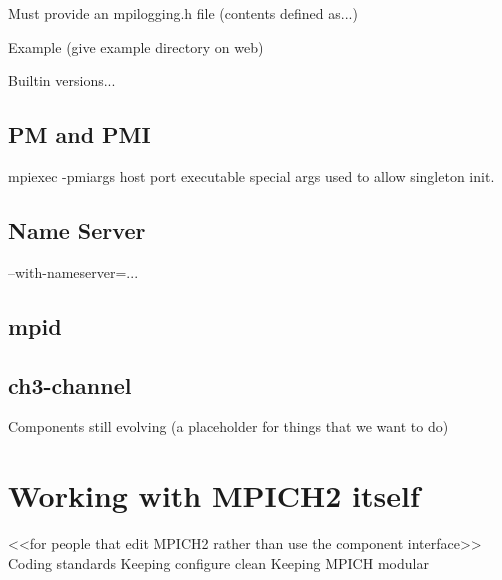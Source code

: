 \documentclass{report}
\begin{document}
    Must provide an mpilogging.h file (contents defined as...)

    Example (give example directory on web)

    Builtin versions...

\section{PM and PMI}

mpiexec 
    -pmiargs host port executable
special args used to allow singleton init.

\section{Name Server}

    --with-nameserver=...

\section{mpid}
\section{ch3-channel}

          Components still evolving (a placeholder for things that we want to do)

\chapter{Working with MPICH2 itself}
          <<for people that edit MPICH2 rather than use the component interface>>
          Coding standards
          Keeping configure clean
          Keeping MPICH modular
          
\end{document}
